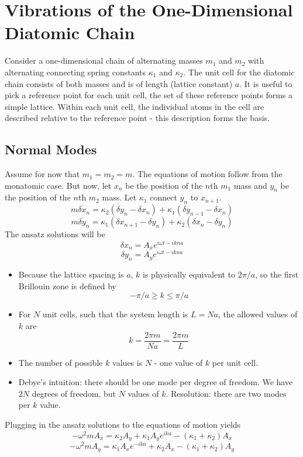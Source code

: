 \documentclass[10pt]{article}
\begin{document}
\section{Vibrations of the One-Dimensional Diatomic Chain}
Consider a one-dimensional chain of alternating masses $m_{1}$ and $m_{2}$ with alternating connecting spring constants $\kappa_{1}$ and $\kappa_{2}$.
The unit cell for the diatomic chain consists of both masses and is of length (lattice constant) $a$. It is useful to pick a reference point for each unit
cell, the set of these reference points forms a simple lattice. Within each unit cell, the individual atoms in the cell are described relative to the reference
point - this description forms the basis.

\subsection{Normal Modes}
Assume for now that $m_{1} = m_{2} = m$. The equations of motion follow from the monatomic case. But now, let $x_{n}$ be the position of the $n$th $m_{1}$
mass and $y_{n}$ be the position of the $n$th $m_{2}$ mass. Let $\kappa_{1}$ connect $y_{n}$ to $x_{n+1}$.
$$m\ddot{\delta x_{n}} = \kappa_{2}(\delta y_{n} - \delta x_{n}) + \kappa_{1}(\delta y_{n-1} - \delta x_{n})$$
$$m\ddot{\delta y_{n}} = \kappa_{1}(\delta x_{n+1} - \delta y_{n}) + \kappa_{2}(\delta x_{n} - \delta y_{n})$$
The ansatz solutions will be
$$\delta x_{n} = A_{x}e^{i \omega t - ikna}$$
$$\delta y_{n} = A_{y}e^{i \omega t - ikna}$$
\begin{itemize}
  \item Because the lattice spacing is $a$, $k$ is physically equivalent to $2\pi/a$, so the first Brillouin zone is defined by
  $$-\pi/a \geq k \leq \pi/a$$
  \item For $N$ unit cells, such that the system length is $L = Na$, the allowed values of $k$ are
  $$k = \frac{2\pi m}{Na} = \frac{2 \pi m}{L}$$
  \item The number of possible $k$ values is $N$ - one value of $k$ per unit cell.
  \item Debye's intuition: there should be one mode per degree of freedom. We have $2N$ degrees of freedom, but $N$ values of $k$. Resolution:
  there are two modes per $k$ value.
\end{itemize}

Plugging in the ansatz solutions to the equations of motion yields
$$-\omega^{2}mA_{x} = \kappa_{2}A_{y} + \kappa_{1}A_{y}e^{ika} - (\kappa_{1} + \kappa_{2})A_{x}$$
$$-\omega^{2}mA_{y} = \kappa_{1}A_{x}e^{-ika} + \kappa_{2}A_{x} - (\kappa_{1} + \kappa_{2})A_{y}$$
\end{document}
